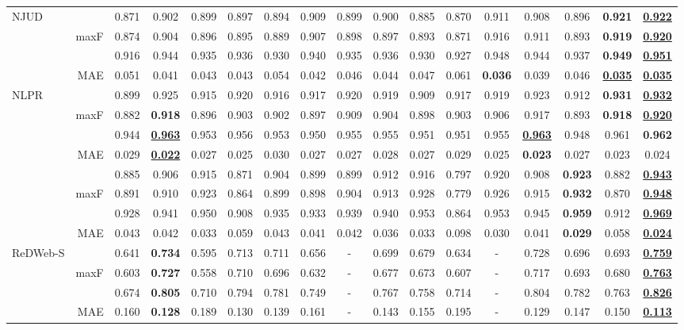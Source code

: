 \documentclass[10pt,twocolumn,letterpaper]{article}
\def\blu#1{\textbf{\color{blue} #1}} \def\red#1{\textbf{\color{red}\underline{#1}}}
\begin{document}
\begin{table*}[t]
\begin{tabular}{lr|cccccccccccccc|c}
  \multirow{4}{*}{NJUD}
    &    &0.871 &0.902 &0.899 &0.897 &0.894 &0.909 &0.899 &0.900 &0.885 &0.870 &0.911 &0.908 &0.896 &\blu{0.921} &\red{0.922}\\
    & maxF  &0.874 &0.904 &0.896 &0.895 &0.889 &0.907 &0.898 &0.897 &0.893 &0.871 &0.916 &0.911 &0.893 &\blu{0.919} &\red{0.920} \\
    &  &0.916 &0.944 &0.935 &0.936 &0.930 &0.940 &0.935 &0.936 &0.930 &0.927 &0.948 &0.944 &0.937 &\blu{0.949} &\red{0.951}\\
  \cite{ju2014njud}& MAE &0.051 &0.041 &0.043 &0.043 &0.054 &0.042 &0.046 &0.044 &0.047 &0.061 &\blu{0.036} &0.039 &0.046 &\red{0.035} &\red{0.035} \\
     \hline
  \multirow{4}{*}{NLPR}
    &    &0.899 &0.925 &0.915 &0.920 &0.916 &0.917 &0.920 &0.919 &0.909 &0.917 &0.919 &0.923 &0.912 &\blu{0.931} &\red{0.932}\\
    & maxF  &0.882 &\blu{0.918} &0.896 &0.903 &0.902 &0.897 &0.909 &0.904 &0.898 &0.903 &0.906 &0.917 &0.893 &\blu{0.918} &\red{0.920}\\
    &  &0.944 &\red{0.963} &0.953 &0.956 &0.953 &0.950 &0.955 &0.955 &0.951 &0.951 &0.955 &\red{0.963} &0.948 &0.961 &\blu{0.962}\\
   \cite{peng2014nlpr}& MAE &0.029 &\red{0.022} &0.027 &0.025 &0.030 &0.027 &0.027 &0.028 &0.027 &0.029 &0.025 &\blu{0.023} &0.027 &0.023 &0.024\\
     \hline
  \multirow{4}{*}{}
    &   &0.885 &0.906 &0.915 &0.871 &0.904 &0.899 &0.899 &0.912 &0.916 &0.797 &0.920 &0.908 &\blu{0.923} &0.882 &\red{0.943}\\
    DUTLF& maxF &0.891 &0.910 &0.923 &0.864 &0.899 &0.898 &0.904 &0.913 &0.928 &0.779 &0.926 &0.915 &\blu{0.932} &0.870 &\red{0.948}\\
    -Depth&   &0.928 &0.941 &0.950 &0.908 &0.935 &0.933 &0.939 &0.940 &0.953 &0.864 &0.953 &0.945 &\blu{0.959} &0.912 &\red{0.969}\\
     \cite{Piao2019dmra}& MAE &0.043 &0.042 &0.033 &0.059 &0.043 &0.041 &0.042 &0.036 &0.033 &0.098 &0.030 &0.041 &\blu{0.029} &0.058 &\red{0.024}\\
     \hline
  \multirow{4}{*}{ReDWeb-S}
    &    &0.641 &\blu{0.734} &0.595 &0.713 &0.711 &0.656 &-	 &0.699 &0.679 &0.634 &- &0.728 &0.696 &0.693 &\red{0.759}\\
    & maxF   &0.603 &\blu{0.727} &0.558 &0.710 &0.696 &0.632 &- &0.677 &0.673 &0.607 &- &0.717 &0.693 &0.680 &\red{0.763}\\
    &   &0.674 &\blu{0.805} &0.710 &0.794 &0.781 &0.749 &- &0.767 &0.758 &0.714 &- &0.804 &0.782 &0.763 &\red{0.826}\\
    \cite{liu2020ReDWeb-S}& MAE  &0.160 &\blu{0.128} &0.189 &0.130 &0.139 &0.161 &- &0.143 &0.155 &0.195 &- &0.129 &0.147 &0.150 &\red{0.113}\\
     \hline


\end{tabular}
\end{table*}
\end{document}
